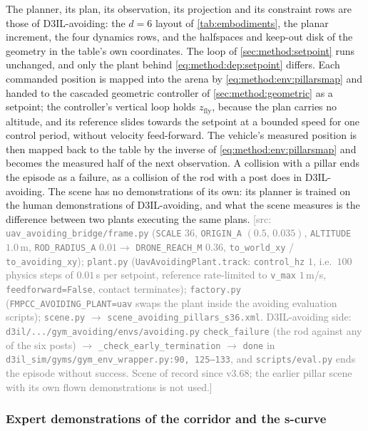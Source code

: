 \documentclass[headsepline,footsepline,footinclude=false,oneside,fontsize=11pt,paper=a4,listof=totoc,bibliography=totoc]{scrbook}
\theoremstyle{definition}
\theoremstyle{plain}
\theoremstyle{remark}
\newcommand{\sidx}[1]{_{\textrm{#1}}}
\newif\ifsubmission
\newcommand{\srcnote}[1]{\ifsubmission\else\textcolor{gray}{\footnotesize\textsf{[src: #1]}}\fi}
\begin{document}
The planner, its plan, its observation, its projection and its constraint rows are those of D3IL-avoiding:
the $d = 6$ layout of \autoref{tab:embodiments}, the planar increment, the four dynamics rows, and the
halfspaces and keep-out disk of the geometry in the table's own coordinates. The loop of
\autoref{sec:method:setpoint} runs unchanged, and only the plant behind \eqref{eq:method:dep:setpoint}
differs. Each commanded position is mapped into the arena by \eqref{eq:method:env:pillarsmap} and handed
to the cascaded geometric controller of \autoref{sec:method:geometric} as a setpoint; the controller's
vertical loop holds $z\sidx{fly}$, because the plan carries no altitude, and its reference slides towards
the setpoint at a bounded speed for one control period, without velocity feed-forward. The vehicle's
measured position is then mapped back to the table by the inverse of \eqref{eq:method:env:pillarsmap}
and becomes the measured half of the next observation. A collision with a pillar ends the episode as a
failure, as a collision of the rod with a post does in D3IL-avoiding. The scene has no demonstrations of its own:
its planner is trained on the human demonstrations of D3IL-avoiding, and what the scene measures is the
difference between two plants executing the same plans.
\srcnote{\texttt{uav\_avoiding\_bridge/frame.py} (\texttt{SCALE} $36$, \texttt{ORIGIN\_A} $(0.5,\,0.035)$,
\texttt{ALTITUDE} $1.0$\,m, \texttt{ROD\_RADIUS\_A} $0.01 \to$ \texttt{DRONE\_REACH\_M} $0.36$,
\texttt{to\_world\_xy} / \texttt{to\_avoiding\_xy}); \texttt{plant.py} (\texttt{UavAvoidingPlant.track}:
\texttt{control\_hz} $1$, i.e.\ $100$ physics steps of $0.01$\,s per setpoint, reference rate-limited to
\texttt{v\_max} $1$\,m/s, \texttt{feedforward=False}, contact terminates); \texttt{factory.py}
(\texttt{FMPCC\_AVOIDING\_PLANT=uav} swaps the plant inside the avoiding evaluation scripts);
\texttt{scene.py} $\to$ \texttt{scene\_avoiding\_pillars\_s36.xml}. D3IL-avoiding side:
\texttt{d3il/.../gym\_avoiding/envs/avoiding.py} \texttt{check\_failure} (the rod against any of the six
posts) $\to$ \texttt{\_check\_early\_termination} $\to$ \texttt{done} in
\texttt{d3il\_sim/gyms/gym\_env\_wrapper.py:90, 125--133}, and \texttt{scripts/eval.py} ends the
episode without success. Scene of record since v3.68; the
earlier pillar scene with its own flown demonstrations is not used.}

\subsubsection*{Expert demonstrations of the corridor and the s-curve}
\end{document}

